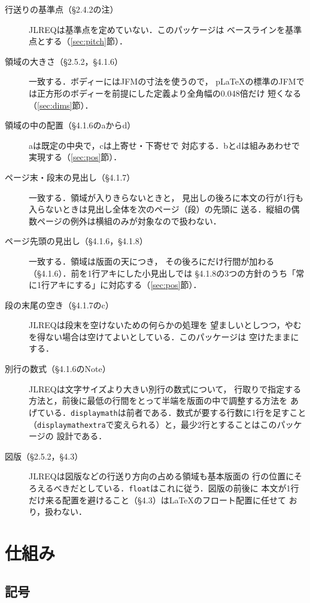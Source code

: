 \documentclass[paper=a4,dvipdfmx]{jlreq}
\newcommand\opt[1]{\texttt{#1}}
\begin{document}
\begin{description}
\item[行送りの基準点（\S2.4.2の注）] JLREQは基準点を定めていない．このパッケージは
  ベースラインを基準点とする（\ref{sec:pitch}\nobreak 節）．
\item[領域の大きさ（\S2.5.2，\S4.1.6）] 一致する．ボディーにはJFMの寸法を使うので，
  pLaTeXの標準のJFMでは正方形のボディーを前提にした定義より全角幅の0.048倍だけ
  短くなる（\ref{sec:dims}\nobreak 節）．
\item[領域の中の配置（\S4.1.6のaからd）] aは既定の中央で，cは上寄せ・下寄せで
  対応する．bとdは組みあわせで実現する（\ref{sec:pos}\nobreak 節）．
\item[ページ末・段末の見出し（\S4.1.7）] 一致する．領域が入りきらないときと，
  見出しの後ろに本文の行が1行も入らないときは見出し全体を次のページ（段）の先頭に
  送る．縦組の偶数ページの例外は横組のみが対象なので扱わない．
\item[ページ先頭の見出し（\S4.1.6，\S4.1.8）] 一致する．領域は版面の天につき，
  その後ろにだけ行間が加わる（\S4.1.6）．前を1行アキにした小見出しでは
  \S4.1.8の3つの方針のうち「常に1行アキにする」に対応する（\ref{sec:pos}\nobreak 節）．
\item[段の末尾の空き（\S4.1.7のc）] JLREQは段末を空けないための何らかの処理を
  望ましいとしつつ，やむを得ない場合は空けてよいとしている．このパッケージは
  空けたままにする．
\item[別行の数式（\S4.1.6のNote）] JLREQは文字サイズより大きい別行の数式について，
  行取りで指定する方法と，前後に最低の行間をとって半端を版面の中で調整する方法を
  あげている．\opt{displaymath}は前者である．数式が要する行数に1行を足すこと
  （\opt{displaymathextra}で変えられる）と，最少2行とすることはこのパッケージの
  設計である．
\item[図版（\S2.5.2，\S4.3）] JLREQは図版などの行送り方向の占める領域も基本版面の
  行の位置にそろえるべきだとしている．\opt{float}はこれに従う．図版の前後に
  本文が1行だけ来る配置を避けること（\S4.3）は\LaTeX{}のフロート配置に任せて
  おり，扱わない．
\end{description}

\section{仕組み}

\subsection{記号}
\end{document}
